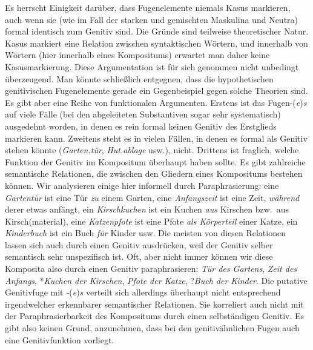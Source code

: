 Es herrscht Einigkeit darüber, dass Fugenelemente niemals Kasus markieren, auch wenn sie (wie im Fall der starken und gemischten Maskulina und Neutra) formal identisch zum Genitiv sind.
Die Gründe sind teilweise theoretischer Natur.
Kasus markiert eine Relation zwischen syntaktischen Wörtern, und innerhalb von Wörtern (hier innerhalb eines Kompositums) erwartet man daher keine Kasusmarkierung.
Diese Argumentation ist für sich genommen nicht unbedingt überzeugend.
Man könnte schließlich entgegnen, dass die hypothetischen genitivischen Fugenelemente gerade ein Gegenbeispiel gegen solche Theorien sind.
Es gibt aber eine Reihe von funktionalen Argumenten.
Erstens ist das Fugen-\textit{}(\textit{e})\textit{s} auf viele Fälle (bei den abgeleiteten Substantiven sogar sehr systematisch) ausgedehnt worden, in denen es rein formal keinen Genitiv des Erstglieds markieren kann.
Zweitens steht es in vielen Fällen, in denen es formal als Genitiv stehen könnte (\textit{Garten.tür}, \textit{Hut.ablage} usw.), nicht.
Drittens ist fraglich, welche Funktion der Genitiv im Kompositum überhaupt haben sollte.
Es gibt zahlreiche semantische Relationen, die zwischen den Gliedern eines Kompositums bestehen können.
Wir analysieren einige hier informell durch Paraphrasierung:
eine \textit{Gartentür} ist eine Tür \textit{zu} einem Garten, eine \textit{Anfangszeit} ist eine Zeit, \textit{während} derer etwas anfängt, ein \textit{Kirschkuchen} ist ein Kuchen \textit{aus} Kirschen bzw.\ aus Kirsch(material), eine \textit{Katzenpfote} ist eine Pfote \textit{als Körperteil} einer Katze, ein \textit{Kinderbuch} ist ein Buch \textit{für} Kinder usw.
Die meisten von diesen Relationen lassen sich auch durch einen Genitiv ausdrücken, weil der Genitiv selber semantisch sehr unspezifisch ist.
Oft, aber nicht immer können wir diese Komposita also durch einen Genitiv paraphrasieren:
\textit{Tür des Gartens}, \textit{Zeit des Anfangs}, *\textit{Kuchen der Kirschen}, \textit{Pfote der Katze}, ?\textit{Buch der Kinder}.
Die putative Genitivfuge mit \textit{-}(\textit{e})\textit{s} verteilt sich allerdings überhaupt nicht entsprechend irgendwelcher erkennbarer semantischer Relationen.
Sie korreliert auch nicht mit der Paraphrasierbarkeit des Kompositums durch einen selbständigen Genitiv.
Es gibt also keinen Grund, anzunehmen, dass bei den genitivähnlichen Fugen auch eine Genitivfunktion vorliegt.


